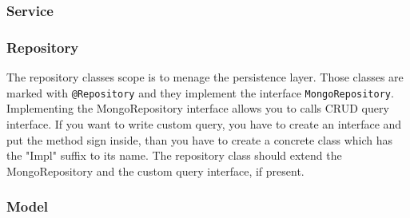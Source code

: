 \subsubsection{Service}
\subsubsection{Repository}
The repository classes scope is to menage the persistence layer. Those classes are marked with \texttt{@Repository} and they implement the interface \texttt{MongoRepository}. Implementing the MongoRepository interface allows you to calls CRUD query interface. 
If you want to write custom query, you have to create an interface and put the method sign inside, than you have to create a concrete class which has the "Impl" suffix to its name. The repository class should extend the MongoRepository and the custom query interface, if present. 
\subsubsection{Model}
